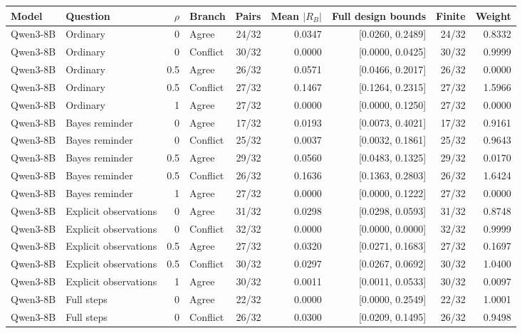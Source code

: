 \begin{table}[t]
\centering
{\small\setlength{\tabcolsep}{4pt}
\begin{tabular*}{\textwidth}{@{\extracolsep{\fill}}llrlrrrrr@{}}
\toprule
Model & Question & $\rho$ & Branch & Pairs & Mean $|R_B|$ & Full design bounds & Finite & Weight \\
\midrule
Qwen3-8B & Ordinary & 0 & Agree & 24/32 & 0.0347 & [0.0260, 0.2489] & 24/32 & 0.8332 \\
Qwen3-8B & Ordinary & 0 & Conflict & 30/32 & 0.0000 & [0.0000, 0.0425] & 30/32 & 0.9999 \\
Qwen3-8B & Ordinary & 0.5 & Agree & 26/32 & 0.0571 & [0.0466, 0.2017] & 26/32 & 0.0000 \\
Qwen3-8B & Ordinary & 0.5 & Conflict & 27/32 & 0.1467 & [0.1264, 0.2315] & 27/32 & 1.5966 \\
Qwen3-8B & Ordinary & 1 & Agree & 27/32 & 0.0000 & [0.0000, 0.1250] & 27/32 & 0.0000 \\
Qwen3-8B & Bayes reminder & 0 & Agree & 17/32 & 0.0193 & [0.0073, 0.4021] & 17/32 & 0.9161 \\
Qwen3-8B & Bayes reminder & 0 & Conflict & 25/32 & 0.0037 & [0.0032, 0.1861] & 25/32 & 0.9643 \\
Qwen3-8B & Bayes reminder & 0.5 & Agree & 29/32 & 0.0560 & [0.0483, 0.1325] & 29/32 & 0.0170 \\
Qwen3-8B & Bayes reminder & 0.5 & Conflict & 26/32 & 0.1636 & [0.1363, 0.2803] & 26/32 & 1.6424 \\
Qwen3-8B & Bayes reminder & 1 & Agree & 27/32 & 0.0000 & [0.0000, 0.1222] & 27/32 & 0.0000 \\
Qwen3-8B & Explicit observations & 0 & Agree & 31/32 & 0.0298 & [0.0298, 0.0593] & 31/32 & 0.8748 \\
Qwen3-8B & Explicit observations & 0 & Conflict & 32/32 & 0.0000 & [0.0000, 0.0000] & 32/32 & 0.9999 \\
Qwen3-8B & Explicit observations & 0.5 & Agree & 27/32 & 0.0320 & [0.0271, 0.1683] & 27/32 & 0.1697 \\
Qwen3-8B & Explicit observations & 0.5 & Conflict & 30/32 & 0.0297 & [0.0267, 0.0692] & 30/32 & 1.0400 \\
Qwen3-8B & Explicit observations & 1 & Agree & 30/32 & 0.0011 & [0.0011, 0.0533] & 30/32 & 0.0097 \\
Qwen3-8B & Full steps & 0 & Agree & 22/32 & 0.0000 & [0.0000, 0.2549] & 22/32 & 1.0001 \\
Qwen3-8B & Full steps & 0 & Conflict & 26/32 & 0.0300 & [0.0209, 0.1495] & 26/32 & 0.9498 \\

\end{tabular*}}
\end{table}
